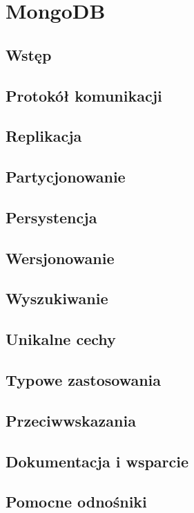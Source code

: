 \section{MongoDB}
\label{sec:mongodb}

\subsection*{Wstęp} 

\subsection*{Protokół komunikacji}

\subsection*{Replikacja}

\subsection*{Partycjonowanie}

\subsection*{Persystencja}

\subsection*{Wersjonowanie}

\subsection*{Wyszukiwanie}

\subsection*{Unikalne cechy}

\subsection*{Typowe zastosowania}

\subsection*{Przeciwwskazania}

\subsection*{Dokumentacja i wsparcie}

\subsection*{Pomocne odnośniki}
